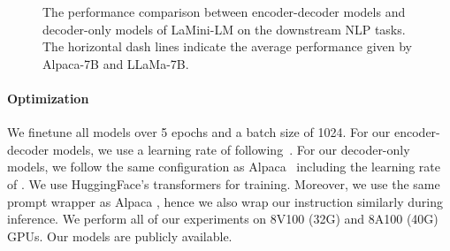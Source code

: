 \documentclass[11pt]{article}
\newcommand{\modelname}{LaMini\xspace}
\newcommand{\modelnamefull}{LaMini-LM\xspace}
\begin{document}
\begin{figure}[t]
    \centering

    \caption{
        The performance comparison between encoder-decoder models and decoder-only models of \modelnamefull on the downstream NLP tasks.
        The horizontal dash lines indicate the average performance given by Alpaca-7B and LLaMa-7B.
    }
    \label{fig:arch_compare}
\end{figure}

%
 
%
 


\paragraph{Optimization}
We finetune all models over 5 epochs and a batch size of 1024. For our encoder-decoder models, we use a learning rate of  following~\citet{DBLP:journals/corr/abs-2210-11416}. For our decoder-only models, we  follow the same configuration as Alpaca~\cite{alpaca} including the learning rate of . We use HuggingFace's transformers for training. Moreover, we use the same prompt wrapper as Alpaca \cite{alpaca}, hence we also wrap our instruction similarly during inference. We perform all of our experiments on 8V100 (32G) and 8A100 (40G) GPUs. Our models are publicly available. 
\end{document}
